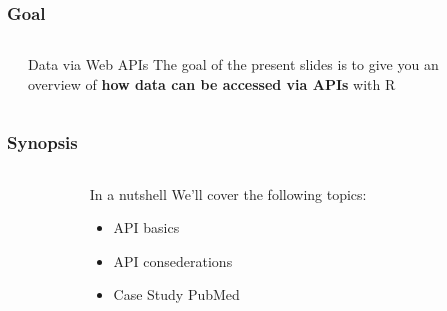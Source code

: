 \documentclass{beamer}\usepackage[]{graphicx}\usepackage[]{color}
\begin{document}
\begin{frame}
\frametitle{Goal}

\begin{columns}[t]
\begin{column}{0.1\textwidth}
\end{column}
\begin{column}{0.8\textwidth}

\begin{block}{Data via Web APIs}
The goal of the present slides is to give you an overview of \textbf{how data can be accessed via APIs} with R
\end{block}

\end{column}
\begin{column}{0.1\textwidth}
\end{column}
\end{columns}

\end{frame}


\begin{frame}
\frametitle{Synopsis}

\begin{columns}[t]
\begin{column}{0.1\textwidth}
\end{column}
\begin{column}{0.8\textwidth}

\begin{block}{In a nutshell}
We'll cover the following topics:
\begin{itemize}
 \item API basics
 \item API consederations
 \item Case Study PubMed
\end{itemize}
\end{block}

\end{column}
\begin{column}{0.1\textwidth}
\end{column}
\end{columns}

\end{frame}

\end{document}
